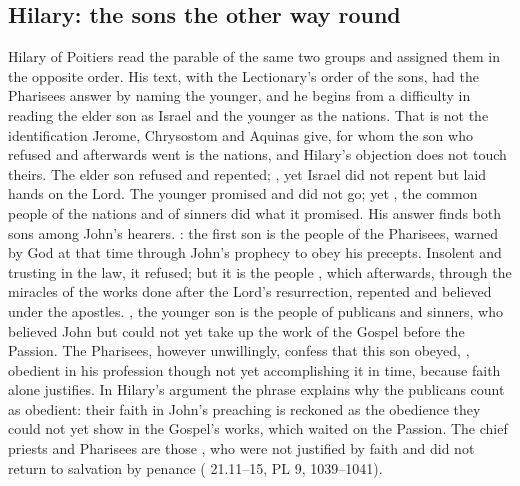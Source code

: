 \subsection{Hilary: the sons the other way round}

Hilary of Poitiers read the parable of the same two groups and assigned them in
the opposite order. His text, with the Lectionary's order of the sons, had the
Pharisees answer by naming the younger, and he begins from a difficulty in
reading the elder son as Israel and the younger as the nations. That is not the
identification Jerome, Chrysostom and Aquinas give, for whom the son who
refused and afterwards went is the nations, and Hilary's objection does not
touch theirs. The elder son refused and repented;
, yet Israel
did not repent but laid hands on the Lord. The younger promised and did not go;
yet , the common
people of the nations and of sinners did what it promised. His answer finds both sons among
John's hearers.
: the first son is the
people of the Pharisees, warned by God at that time through John's prophecy to
obey his precepts. Insolent and trusting in the law, it refused; but it is the
people , which afterwards, through the miracles of the works
done after the Lord's resurrection, repented and believed under the apostles.
, the younger
son is the people of publicans and sinners, who believed John but could not yet
take up the work of the Gospel before the Passion. The Pharisees, however
unwillingly, confess that this son obeyed, , obedient in his
profession though not yet accomplishing it in time, because faith alone
justifies. In Hilary's argument the phrase explains why the publicans count as
obedient: their faith in John's preaching is reckoned as the obedience they
could not yet show in the Gospel's works, which waited on the Passion. The
chief priests and Pharisees are those , who were
not justified by faith and did not return to salvation by penance
( 21.11--15, PL 9, 1039--1041).

